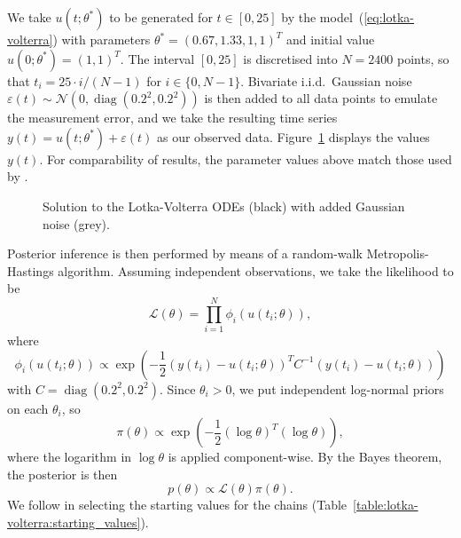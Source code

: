 \documentclass[11pt,a4paper]{report}
\DeclareMathOperator{\diag}{diag}
\begin{document}
We take $u(t;\theta^*)$ to be generated for $t \in [0, 25]$ by the model~(\ref{eq:lotka-volterra}) with parameters $\theta^* = (0.67, 1.33, 1, 1)^T$ and initial value $u(0; \theta^*) = (1, 1)^T$. The interval $[0, 25]$ is discretised into $N = 2400$ points, so that $t_i = 25 \cdot i / (N - 1)$ for $i \in \{0, N - 1\}$. Bivariate i.i.d.\ Gaussian noise $\varepsilon(t) \sim \mathcal{N}\left( 0, \diag(0.2^2, 0.2^2) \right)$ is then added to all data points to emulate the measurement error, and we take the resulting time series $y(t) = u(t;\theta^*) + \varepsilon(t)$ as our observed data. Figure~\ref{fig:lotka-volterra:data} displays the values $y(t)$. For comparability of results, the parameter values above match those used by \cite{riabizOptimalThinningMCMC2022}. 

\begin{figure}[h]
\centering
{}
\caption{Solution to the Lotka-Volterra ODEs (black) with added Gaussian noise (grey).
\label{fig:lotka-volterra:data}}
\end{figure}

Posterior inference is then performed by means of a random-walk Metropolis-Hastings algorithm. Assuming independent observations, we take the likelihood to be
\begin{equation}
\mathcal{L}(\theta) = \prod_{i=1}^N \phi_i(u(t_i; \theta)),
\label{eq:lotka-volterra:likelihood}
\end{equation}
where 
\begin{equation}
\phi_i(u(t_i;\theta)) \propto \exp\left( -\frac{1}{2} (y(t_i) - u(t_i; \theta))^T C^{-1} (y(t_i) - u(t_i; \theta)) \right)
\label{eq:lotka-volterra:error-distr}
\end{equation}
with $C = \diag(0.2^2, 0.2^2)$. Since $\theta_i > 0$, we put independent log-normal priors on each $\theta_i$, so
\begin{equation}
\pi(\theta) \propto \exp \left(-\frac{1}{2} (\log \theta)^T (\log \theta) \right),
\label{eq:lotka-volterra:prior}
\end{equation}
where the logarithm in $\log \theta$ is applied component-wise.
By the Bayes theorem, the posterior is then
\begin{equation}
p(\theta) \propto \mathcal{L}(\theta) \pi(\theta).
\label{eq:lotka-volterra:posterior}
\end{equation}
We follow \cite{riabizOptimalThinningMCMC2022} in selecting the starting values for the chains (Table~\ref{table:lotka-volterra:starting_values}).
\end{document}
